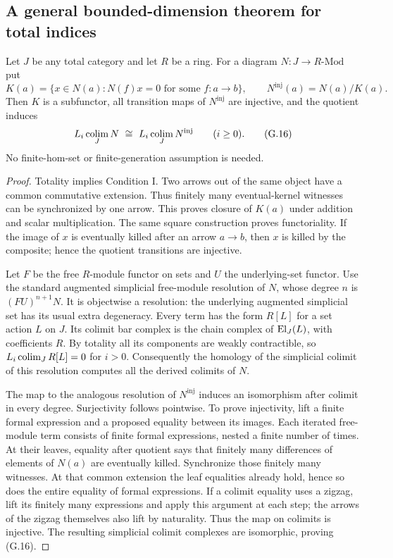 \subsection{A general bounded-dimension theorem for total indices}

\begin{proposition}
\label{G:moduleinjectivization}
Let $J$ be any total category and let $R$ be a ring.  For a
diagram $N:J\to R\text{-}\mathrm{Mod}$ put
\[
 K(a)=\{x\in N(a):N(f)x=0\text{ for some }f:a\to b\},
 \qquad N^{\mathrm{inj}}(a)=N(a)/K(a).
\]
Then $K$ is a subfunctor, all transition maps of
$N^{\mathrm{inj}}$ are injective, and the quotient induces
\[
 L_i\operatorname*{colim}_JN\ \cong\ L_i\operatorname*{colim}_JN^{\mathrm{inj}}
 \qquad(i\ge0).
 \tag{G.16}
\]
No finite-hom-set or finite-generation assumption is needed.
\end{proposition}
\begin{proof}
Totality implies Condition I.  Two arrows out of the same
object have a common commutative extension.  Thus finitely
many eventual-kernel witnesses can be synchronized by one
arrow.  This proves closure of $K(a)$ under addition and
scalar multiplication.  The same square construction proves
functoriality.  If the image of $x$ is eventually killed after
an arrow $a\to b$, then $x$ is killed by the composite; hence
the quotient transitions are injective.

Let $F$ be the free $R$-module functor on sets and $U$ the
underlying-set functor.  Use the standard augmented simplicial
free-module resolution of $N$, whose degree $n$ is
$(FU)^{n+1}N$.  It is objectwise a resolution: the underlying
augmented simplicial set has its usual extra degeneracy.
Every term has the form $R[L]$ for a set action $L$ on $J$.
Its colimit bar complex is the chain complex of
$\operatorname{El}_J(L)$, with coefficients $R$.  By totality all its
components are weakly contractible, so
$L_i\operatorname*{colim}_JR[L]=0$ for $i>0$.
Consequently the homology of the simplicial colimit of this
resolution computes all the derived colimits of $N$.

The map to the analogous resolution of $N^{\mathrm{inj}}$
induces an isomorphism after colimit in every degree.
Surjectivity follows pointwise.  To prove injectivity, lift a
finite formal expression and a proposed equality between its
images.  Each iterated free-module term consists of finite
formal expressions, nested a finite number of times.  At
their leaves, equality after quotient says that finitely many
differences of elements of $N(a)$ are eventually killed.
Synchronize those finitely many witnesses.  At that common
extension the leaf equalities already hold, hence so does
the entire equality of formal expressions.  If a colimit
equality uses a zigzag, lift its finitely many expressions
and apply this argument at each step; the arrows of the
zigzag themselves also lift by naturality.  Thus the map
on colimits is injective.  The resulting simplicial colimit
complexes are isomorphic, proving (G.16).
\end{proof}

